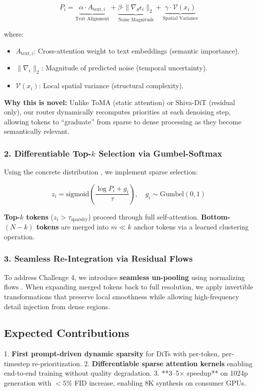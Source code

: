 \documentclass{article}
\begin{document}
$$P_i = \underbrace{\alpha \cdot A_{\text{text}, i}}_{\text{Text Alignment}} +
    \underbrace{\beta \cdot \|\nabla_\theta \epsilon_i\|_2}_{\text{Noise Magnitude}} +
    \underbrace{\gamma \cdot \mathcal{V}(x_i)}_{\text{Spatial Variance}}$$

where:
\begin{itemize}
    \item $A_{\text{text}, i}$: Cross-attention weight to text embeddings
          (semantic importance).
    \item $\|\nabla_\epsilon\|_2$: Magnitude of predicted noise (temporal
          uncertainty).
    \item $\mathcal{V}(x_i)$: Local spatial variance (structural complexity).
\end{itemize}

\textbf{Why this is novel:} Unlike ToMA (static attention) or Shiva-DiT
(residual only), our router dynamically recomputes priorities at each
denoising step, allowing tokens to ``graduate'' from sparse to dense
processing as they become semantically relevant.

\subsubsection{2. Differentiable Top-$k$ Selection via Gumbel-Softmax}
Using the concrete distribution \cite{jang2016categorical}, we implement
sparse selection:

$$
    z_i = \text{sigmoid}\left(\frac{\log P_i + g_i}{\tau}\right), \quad g_i \sim \text{Gumbel}(0,1)
$$

\textbf{Top-$k$ tokens} ($z_i > \tau_{\text{sparsity}}$) proceed through
full self-attention. \textbf{Bottom-$(N-k)$ tokens} are merged into $m \ll k$
anchor tokens via a learned clustering operation.

\subsubsection{3. Seamless Re-Integration via Residual Flows}
To address Challenge 4, we introduce \textbf{seamless un-pooling} using
normalizing flows \cite{dinh2016density}. When expanding merged tokens
back to full resolution, we apply invertible transformations that
preserve local smoothness while allowing high-frequency detail injection
from dense regions.

\subsection{Expected Contributions}
1. \textbf{First prompt-driven dynamic sparsity} for DiTs with per-token,
per-timestep re-prioritization.
2. \textbf{Differentiable sparse attention kernels} enabling end-to-end
training without quality degradation.
3. **3--5$\times$ speedup** on 1024p generation with $<5\%$ FID increase,
enabling 8K synthesis on consumer GPUs.
\end{document}
